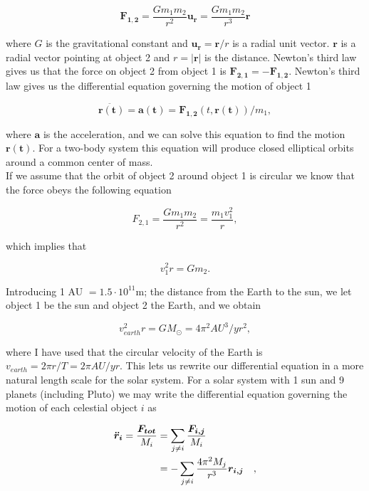 \documentclass[%
 reprint,
 nobalance,
 amsmath,amssymb,
 aps,
]{revtex4-1}
\begin{document}
\begin{equation}
	\bm{F_{1,2}} = \frac{Gm_1 m_2}{r^2} \bm{u_r} = \frac{Gm_1 m_2}{r^3} \bm{r}
\end{equation}

where $G$ is the gravitational constant and $\bm{u_r} = \bm{r}/r$ is a radial unit vector. $\bm{r}$ is a radial vector pointing at object 2 and $r = \left|\bm{r}\right| $ is the distance. Newton's third law gives us that the force on object 2 from object 1 is $\bm{F_{2,1}} = - \bm{F_{1,2}}$. Newton's third law gives us the differential equation governing the motion of object 1

\begin{equation}
	\bm{\ddot{r(t)}} = \bm{a(t)} = \bm{F_{1,2}}(t, \bm{r(t)})/m_1,
\end{equation}

where $\bm{a}$ is the acceleration, and we can solve this equation to find the motion $\bm{r(t)}$. For a two-body system this equation will produce closed elliptical orbits around a common center of mass.\\
If we assume that the orbit of object 2 around object 1 is circular we know that the force obeys the following equation

\begin{equation}
	F_{2,1} = \frac{Gm_1 m_2}{r^2} = \frac{m_1 v_{1}^{2}}{r},
\end{equation}

which implies that

\begin{equation}
	v_{1}^{2}r = G m_2.
\end{equation}

Introducing 1 AU $= 1.5\cdot10^{11}$m; the distance from the Earth to the sun, we let object 1 be the sun and object 2 the Earth, and we obtain

\begin{equation}
	v_{earth}^2 r = G M_{\odot} = 4\pi^{2} AU^{3}/yr^{2},
\end{equation}

where I have used that the circular velocity of the Earth is $v_{earth} = 2\pi r/T = 2\pi AU/yr$. This lets us rewrite our differential equation in a more natural length scale for the solar system. For a solar system with 1 sun and 9 planets (including Pluto) we may write the differential equation governing the motion of each celestial object $i$ as

\begin{equation}{\label{eq:6}}
\begin{split}
	\bm{\ddot r_i} = \frac{\bm{F_{tot}}}{M_i}
	&= \sum_{j \neq i} \frac{\bm{F_{i,j}}}{M_i} \\
	&= -\sum_{j \neq i} \frac{4 \pi^{2} M_j}{r^{3}} \bm{r_{i,j}} \quad,
\end{split}
\end{equation}
\end{document}

